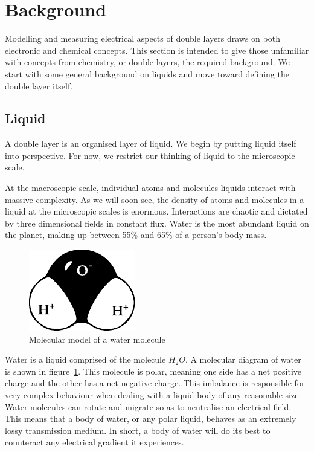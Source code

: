 
\section{Background}
  Modelling and measuring electrical aspects of double layers draws on both electronic and chemical concepts.
  This section is intended to give those unfamiliar with concepts from chemistry, or double layers, the required background.
  We start with some general background on liquids and move toward defining the double layer itself.

  \subsection{Liquid}
    A double layer is an organised layer of liquid.
    We begin by putting liquid itself into perspective.
    For now, we restrict our thinking of liquid to the microscopic scale.

    At the macroscopic scale, individual atoms and molecules liquids interact with massive complexity.
    As we will soon see, the density of atoms and molecules in a liquid at the microscopic scales is enormous.
    Interactions are chaotic and dictated by three dimensional fields in constant flux.
    Water is the most abundant liquid on the planet, making up between 55\% and 65\% of a person's body mass.

    \begin{figure}
        \begin{center}
            \includegraphics{content/introduction/graphics/polarWater}
        \end{center}
        \caption{Molecular model of a water molecule}
        \label{fig:waterMolecule}
    \end{figure}

    Water is a liquid comprised of the molecule $H_{2}O$.
    A molecular diagram of water is shown in figure~\ref{fig:waterMolecule}.
    This molecule is polar, meaning one side has a net positive charge and the other has a net negative charge.
    This imbalance is responsible for very complex behaviour when dealing with a liquid body of any reasonable size.
    Water molecules can rotate and migrate so as to neutralise an electrical field.
    This means that a body of water, or any polar liquid, behaves as an extremely lossy transmission medium.
    In short, a body of water will do its best to counteract any electrical gradient it experiences.

